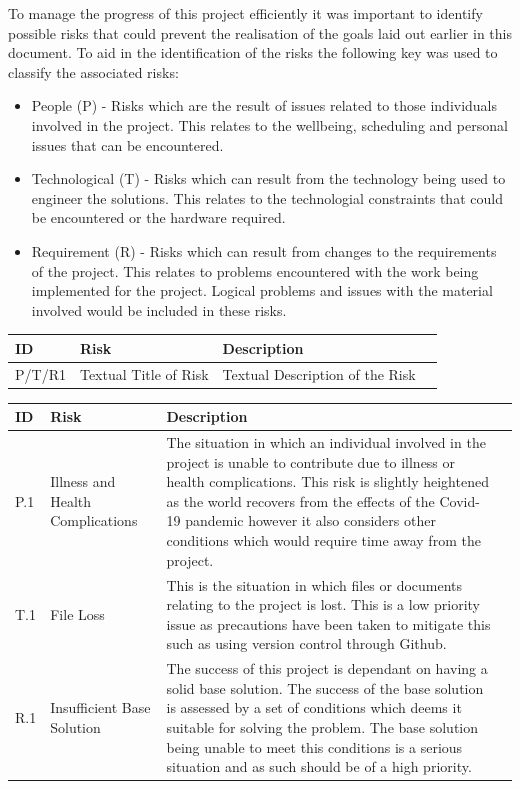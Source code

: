 \documentclass[12pt]{article}  %
\theoremstyle{definition}
\theoremstyle{remark}
\begin{document}
To manage the progress of this project efficiently it was important to identify possible risks that could prevent the realisation of the goals laid out earlier in this document. To aid in the identification of the risks the following key was used to classify the associated risks:
\begin{itemize}
\item{People (P) - Risks which are the result of issues related to those individuals involved in the project. This relates to the wellbeing, scheduling and personal issues that can be encountered.}
\item{Technological (T) - Risks which can result from the technology being used to engineer the solutions. This relates to the technologial constraints that could be encountered or the hardware required.}
\item{Requirement (R)  - Risks which can result from changes to the requirements of the project. This relates to problems encountered with the work being implemented for the project. Logical problems and issues with the material involved would be included in these risks.}
\end{itemize}

\begin{tabularx}{1.1\textwidth} {
	|  >{\center\arraybackslash}X
	| >{\center\arraybackslash}X
	| >{\center\arraybackslash}X
	| >{\center\arraybackslash} X | }
	\hline
	ID & Risk & Description \\
	\hline
	P/T/R1 & Textual Title of Risk & Textual Description of the Risk \\
	\hline
\end{tabularx}

\begin{tabularx}{1.1\textwidth} {
	|  >{\center\arraybackslash}X
	| >{\center\arraybackslash}X
	| >{\center\arraybackslash}X
	| >{\center\arraybackslash} X | }
	\hline
	ID & Risk & Description \\
	\hline
	P.1 & Illness and Health Complications & The situation in which an individual involved in the project is unable to contribute due to illness or health complications. This risk is slightly heightened as the world recovers from the effects of the Covid-19 pandemic however it also considers other conditions which would require time away from the project. \\
	\hline
	T.1 & File Loss & This is the situation in which files or documents relating to the project is lost. This is a low priority issue as precautions have been taken to mitigate this such as using version control through Github. \\
	\hline
	R.1 & Insufficient Base Solution & The success of this project is dependant on having a solid base solution. The success of the base solution is assessed by a set of conditions which deems it suitable for solving the problem. The base solution being unable to meet this conditions is a serious situation and as such should be of a high priority. \\
	\hline
\end{tabularx}
\end{document}
